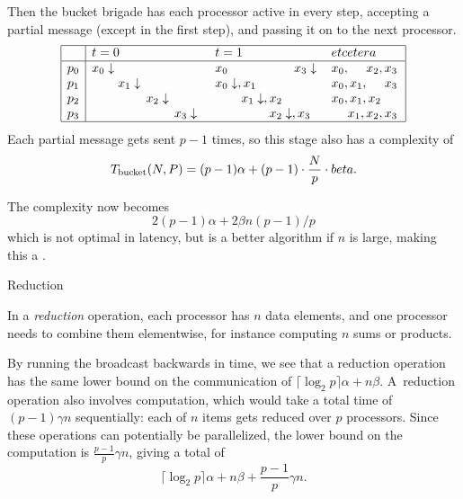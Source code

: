 Then the bucket brigade has each processor active in every step,
accepting a partial message (except in the first step), and passing it
on to the next processor.
\[
\begin{array}{|c|lll|}
\hline
  &t=0&t=1&et cetera\\ \hline
p_0&x_0\downarrow\hphantom{,x_1\downarrow,x_2\downarrow,x_3\downarrow}
   &x_0\hphantom{\downarrow,x_1\downarrow,x_2\downarrow,}x_3\downarrow
   &x_0,\hphantom{x_1,}x_2,x_3\\
p_1&\hphantom{x_0\downarrow,}x_1\downarrow\hphantom{,x_2\downarrow,x_3\downarrow}
   &x_0\downarrow,x_1\hphantom{\downarrow,x_2\downarrow,x_3\downarrow}
   &x_0,x_1,\hphantom{x_2,}x_3\\
p_2&\hphantom{x_0\downarrow,x_1\downarrow,}x_2\downarrow\hphantom{,x_3\downarrow}
   &\hphantom{x_0\downarrow,}x_1\downarrow,x_2\hphantom{\downarrow,x_3\downarrow}
   &x_0,x_1,x_2\hphantom{,x_3}\\
p_3&\hphantom{x_0\downarrow,x_1\downarrow,x_2\downarrow,}x_3\downarrow
   &\hphantom{x_0\downarrow,x_1\downarrow,}x_2\downarrow,x_3\hphantom{\downarrow}
   &\hphantom{x_0,}x_1,x_2,x_3\\
\hline
\end{array}
\]
Each partial message gets sent $p-1$ times, so this stage also has a
complexity of 
\[ T_{\scriptsize\mathrm{bucket}}(N,P) = (p-1)\alpha +
(p-1)\cdot\frac{N}{p}\cdot beta.
\]

The complexity now becomes \[ 2(p-1)\alpha+2\beta n(p-1)/p \]
which is not optimal in latency, but is a better algorithm if $n$ is large,
making this a .


 {Reduction}
\label{sec:reduction}

In a \emph{reduction} operation, each processor has $n$ data elements, and
one processor needs to combine them elementwise, for instance
computing $n$ sums or products.

By running the broadcast backwards in time, we see that a reduction
operation has the same lower bound on the communication of
$\lceil\log_2 p\rceil \alpha+n\beta$.  A~reduction operation also
involves computation, which would take a total time of $(p-1)\gamma n$
sequentially: each of
$n$ items gets reduced over $p$ processors. Since these operations can
potentially be parallelized, the lower bound on the computation is
$\frac{p-1}p \gamma n$, giving a total of
    \[ \lceil\log_2 p\rceil \alpha+n\beta +\frac{p-1}p \gamma n. \]

